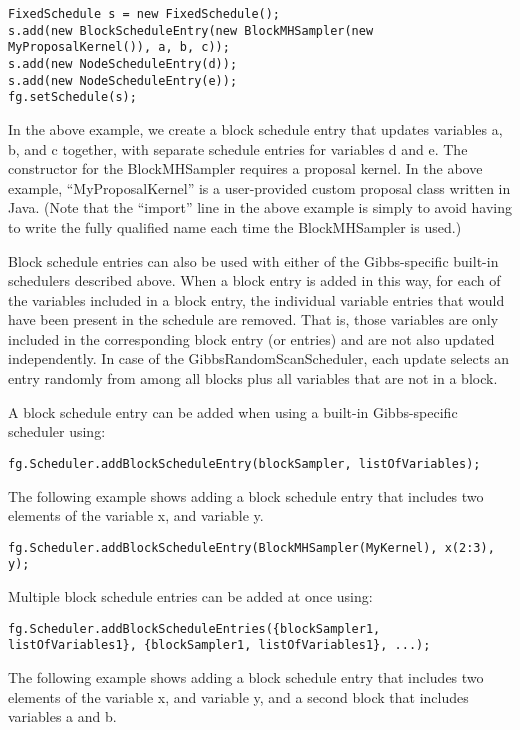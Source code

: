 \begin{lstlisting}
FixedSchedule s = new FixedSchedule();
s.add(new BlockScheduleEntry(new BlockMHSampler(new MyProposalKernel()), a, b, c));
s.add(new NodeScheduleEntry(d));
s.add(new NodeScheduleEntry(e));
fg.setSchedule(s);
\end{lstlisting}
\fi

In the above example, we create a block schedule entry that updates variables a, b, and c together, with separate schedule entries for variables d and e.  The constructor for the BlockMHSampler requires a proposal kernel.  In the above example, ``MyProposalKernel'' is a user-provided custom proposal class \ifmatlab written in Java\fi.  \ifmatlab (Note that the ``import'' line in the above example is simply to avoid having to write the fully qualified name each time the BlockMHSampler is used.) \fi

Block schedule entries can also be used with either of the Gibbs-specific built-in schedulers described above.  When a block entry is added in this way, for each of the variables included in a block entry, the individual variable entries that would have been present in the schedule are removed.  That is, those variables are only included in the corresponding block entry (or entries) and are not also updated independently.  In case of the GibbsRandomScanScheduler, each update selects an entry randomly from among all blocks plus all variables that are not in a block.

\ifmatlab
A block schedule entry can be added when using a built-in Gibbs-specific scheduler using:
\begin{lstlisting}
fg.Scheduler.addBlockScheduleEntry(blockSampler, listOfVariables);
\end{lstlisting}

The following example shows adding a block schedule entry that includes two elements of the variable x, and variable y.

\begin{lstlisting}
fg.Scheduler.addBlockScheduleEntry(BlockMHSampler(MyKernel), x(2:3), y);
\end{lstlisting}


Multiple block schedule entries can be added at once using:
\begin{lstlisting}
fg.Scheduler.addBlockScheduleEntries({blockSampler1, listOfVariables1}, {blockSampler1, listOfVariables1}, ...);
\end{lstlisting}

The following example shows adding a block schedule entry that includes two elements of the variable x, and variable y, and a second block that includes variables a and b.

